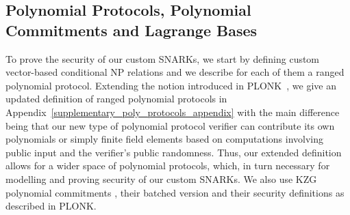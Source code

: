 \subsection{Polynomial Protocols, Polynomial Commitments and Lagrange Bases}
To prove the security of our custom SNARKs, we start by defining custom vector-based conditional NP relations and we describe for each of them a ranged polynomial protocol. 
Extending the notion introduced in PLONK~\cite{plonk}, we give an updated definition of ranged polynomial protocols in Appendix~\ref{supplementary_poly_protocols_appendix} with the main difference 
being that our new type of polynomial protocol verifier can contribute its own polynomials or simply finite field elements based on computations involving public input and the verifier's public randomness.
Thus, our extended definition allows for a wider space of polynomial protocols, which, in turn necessary for modelling and proving security of our custom SNARKs. 
We also use KZG polynomial commitments \cite{KZG_10}, their batched version and their security definitions as described in PLONK. 
\vspace{-0.07in}


